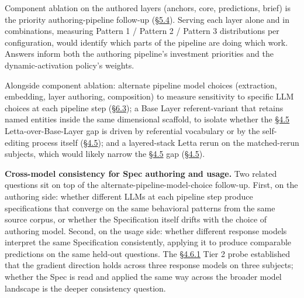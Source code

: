 Component ablation on the authored layers (anchors, core, predictions,
brief) is the priority authoring-pipeline follow-up (\hyperref[composition-with-retrieval]{§5.4}). Serving each
layer alone and in combinations, measuring Pattern 1 / Pattern 2 /
Pattern 3 distributions per configuration, would identify which parts of
the pipeline are doing which work. Answers inform both the authoring
pipeline's investment priorities and the dynamic-activation policy's
weights.

Alongside component ablation: alternate pipeline model choices
(extraction, embedding, layer authoring, composition) to measure
sensitivity to specific LLM choices at each pipeline step (\hyperref[pipeline-and-specification-stability]{§6.3}); a Base
Layer referent-variant that retains named entities inside the same
dimensional scaffold, to isolate whether the \hyperref[exploratory-case-study-letta-stateful-agent-n3-post-hoc]{§4.5} Letta-over-Base-Layer
gap is driven by referential vocabulary or by the self-editing process
itself (\hyperref[exploratory-case-study-letta-stateful-agent-n3-post-hoc]{§4.5}); and a layered-stack Letta rerun on the matched-rerun
subjects, which would likely narrow the \hyperref[exploratory-case-study-letta-stateful-agent-n3-post-hoc]{§4.5} gap (\hyperref[exploratory-case-study-letta-stateful-agent-n3-post-hoc]{§4.5}).

\textbf{Cross-model consistency for Spec authoring and usage.} Two
related questions sit on top of the alternate-pipeline-model-choice
follow-up. First, on the authoring side: whether different LLMs at each
pipeline step produce specifications that converge on the same
behavioral patterns from the same source corpus, or whether the
Specification itself drifts with the choice of authoring model. Second,
on the usage side: whether different response models interpret the same
Specification consistently, applying it to produce comparable
predictions on the same held-out questions. The \hyperref[cross-provider-response-generation-tier-2-replication]{§4.6.1} Tier 2 probe
established that the gradient direction holds across three response
models on three subjects; whether the Spec is read and applied the same
way across the broader model landscape is the deeper consistency
question.

